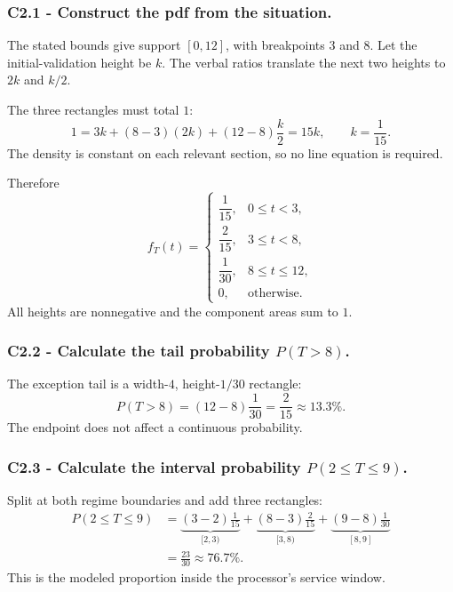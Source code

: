 \subsubsection*{C2.1 - Construct the pdf from the situation.}
\label{subsec:c2-piecewise-uniform-reconciliation-a}
The stated bounds give support $[0,12]$, with breakpoints $3$ and $8$.  Let
the initial-validation height be $k$.  The verbal ratios translate the next
two heights to $2k$ and $k/2$.

The three rectangles must total $1$:
\[
 1=3k+(8-3)(2k)+(12-8)\frac{k}{2}=15k,\qquad k=\frac1{15}.
\]
The density is constant on each relevant section, so no line equation is required.

Therefore
\[
 f_T(t)=\begin{cases}
 \dfrac1{15},&0\le t<3,\\[1mm]
 \dfrac2{15},&3\le t<8,\\[1mm]
 \dfrac1{30},&8\le t\le12,\\[1mm]
 0,&\text{otherwise.}
 \end{cases}
\]
All heights are nonnegative and the component areas sum to $1$.

\subsubsection*{C2.2 - Calculate the tail probability $P(T>8)$.}
\label{subsec:c2-piecewise-uniform-reconciliation-b}
The exception tail is a width-$4$, height-$1/30$ rectangle:
\[
 P(T>8)=(12-8)\frac1{30}=\frac2{15}\approx13.3\%.
\]
The endpoint does not affect a continuous probability.

\subsubsection*{C2.3 - Calculate the interval probability $P(2\le T\le9)$.}
\label{subsec:c2-piecewise-uniform-reconciliation-c}
Split at both regime boundaries and add three rectangles:
\[
 \begin{aligned}
 P(2\le T\le9)
 &=\underbrace{(3-2)\frac1{15}}_{[2,3)}
 +\underbrace{(8-3)\frac2{15}}_{[3,8)}
 +\underbrace{(9-8)\frac1{30}}_{[8,9]}\\
 &=\frac{23}{30}\approx76.7\%.
 \end{aligned}
\]
This is the modeled proportion inside the processor's service window.

